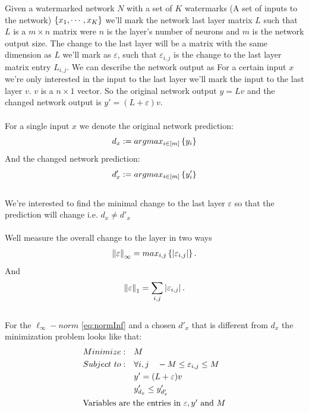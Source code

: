 \documentclass[a4paper]{llncs}
\begin{document}
Given a watermarked network $N$ with a set of $K$ watermarks (A set of
inputs to the network) $\left\lbrace x_1,\cdots,x_K\right\rbrace$ we'll mark the network last layer matrix $L$ such that $L$ is a $m\times n$ matrix were $n$
is the layer's number of neurons and $m$ is the network output size.
The change to the last layer will be a matrix with the same dimension
as $L$ we'll mark as $\varepsilon$, such that $\varepsilon_{i,j}$ is the change to the last layer matrix entry $L_{i,j}$. We can describe the network output as  
For a certain input $x$ we're only interested in the input to the last layer we'll mark the input to the last layer $v$. $v$ is a $n\times 1$
vector.  So the original network output $y = Lv$ and the changed
network output is $y' = (L+\varepsilon)v$.
\\\\
For a single input $x$ we denote the original network prediction:
$$
   	d_x := argmax_{i\in \left[m\right]}\left\lbrace y_i\right\rbrace
$$
And the changed network prediction:
$$
   	d'_x := argmax_{i\in \left[m\right]}\left\lbrace y'_i\right\rbrace
$$
\\
We're interested to find the minimal change to the last layer $\varepsilon$  so that the prediction will change i.e. $d_x\neq d'_x$
\\\\
Well measure the overall change to the layer in two ways
\begin{equation}
\label{eq:normInf}
	\begin{split}
   		\left\lVert\varepsilon\right\rVert_{\infty}=max_{i,j}\left\lbrace \left\lvert\varepsilon_{i,j}\right\rvert\right\rbrace.
	\end{split}
\end{equation}
And
\begin{equation}
\label{eq:normOne}
	\begin{split}
   		\left\lVert\varepsilon\right\rVert_1=\sum_{i,j}\left\lvert\varepsilon_{i,j}\right\rvert.
	\end{split}
\end{equation}
\\
For the $\ell_\infty-norm$ \ref{eq:normInf} and a chosen $d'_x$ that is different from $d_x$ the minimization problem looks like that:
\begin{equation}
\label{eq:LP}
\begin{split}
    Minimize:\quad & M \\
    Subject\ to:\quad & \forall i,j\quad -M \leq\varepsilon_{i,j}\leq M \\
    & y'=(L+\varepsilon)v \\
    & y'_{d_x} \leq y'_{d'_x} \\
	\intertext{Variables are the entries in $\varepsilon,y'$ and $M$}
\end{split}
\end{equation}
\end{document}
